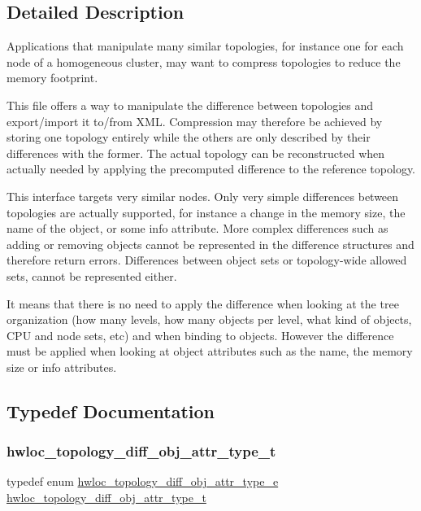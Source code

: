\subsection{Detailed Description}
Applications that manipulate many similar topologies, for instance one for each node of a homogeneous cluster, may want to compress topologies to reduce the memory footprint.

This file offers a way to manipulate the difference between topologies and export/import it to/from X\+ML. Compression may therefore be achieved by storing one topology entirely while the others are only described by their differences with the former. The actual topology can be reconstructed when actually needed by applying the precomputed difference to the reference topology.

This interface targets very similar nodes. Only very simple differences between topologies are actually supported, for instance a change in the memory size, the name of the object, or some info attribute. More complex differences such as adding or removing objects cannot be represented in the difference structures and therefore return errors. Differences between object sets or topology-\/wide allowed sets, cannot be represented either.

It means that there is no need to apply the difference when looking at the tree organization (how many levels, how many objects per level, what kind of objects, C\+PU and node sets, etc) and when binding to objects. However the difference must be applied when looking at object attributes such as the name, the memory size or info attributes. 

\subsection{Typedef Documentation}
\mbox{\label{a00225_ga5f2dd099de2cacdc0d0d4858154b971a}} 
\subsubsection{\texorpdfstring{hwloc\+\_\+topology\+\_\+diff\+\_\+obj\+\_\+attr\+\_\+type\+\_\+t}{hwloc\_topology\_diff\_obj\_attr\_type\_t}}
{\footnotesize\ttfamily typedef enum \hyperlink{a00225_ga86f044210b0a9e9fa83acbdbbf7e05fd}{hwloc\+\_\+topology\+\_\+diff\+\_\+obj\+\_\+attr\+\_\+type\+\_\+e}  \hyperlink{a00225_ga5f2dd099de2cacdc0d0d4858154b971a}{hwloc\+\_\+topology\+\_\+diff\+\_\+obj\+\_\+attr\+\_\+type\+\_\+t}}



